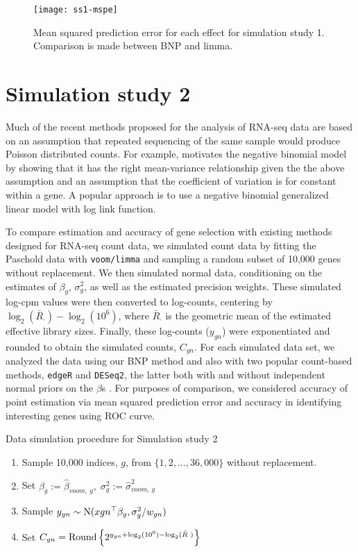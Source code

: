\begin{figure}[ht!]
\centering
\texttt{[image: ss1-mspe]}
\begin{minipage}{.8\textwidth}
\caption{\small Mean squared prediction error for each effect for simulation study 1. Comparison is made between BNP and limma.}
\label{mspe-ss1}
\end{minipage}
\end{figure}

\section{Simulation study 2}
\label{sec:ss2}
Much of the recent methods proposed for the analysis of RNA-seq data are based on an assumption that repeated sequencing of the same sample would produce Poisson distributed counts. For example, \cite{mccarthy} motivates the negative binomial model by showing that it has the right mean-variance relationship given the the above assumption and an assumption that the coefficient of variation is for constant within a gene. A popular approach is to use a negative binomial generalized linear model with log link function.

To compare estimation and accuracy of gene selection with existing methods designed for RNA-seq count data, we simulated count data by fitting the Paschold data with \texttt{voom/limma} and sampling a random subset of 10,000 genes without replacement. We then simulated normal data, conditioning on the estimates of $\beta_g$, $\sigma^2_g$, as well as the estimated precision weights. These simulated log-cpm values were then converted to log-counts, centering by $\log_2(\bar{R}_\cdot)-\log_2(10^6)$, where $\bar{R}_\cdot$ is the geometric mean of the estimated effective library sizes. Finally, these log-counts ($y_{gn}$) were exponentiated and rounded to obtain the simulated counts, $C_{gn}$. For each simulated data set, we analyzed the data using our BNP method and also with two popular count-based methods, \texttt{edgeR} and \texttt{DESeq2}, the latter both with and without independent normal priors on the $\beta$s \citep{edger2010,deseq2014}. For purposes of comparison, we considered accuracy of point estimation via mean squared prediction error and accuracy in identifying interesting genes using ROC curve.
\begin{table}
\caption{Data simulation procedure for Simulation study 2}
\begin{enumerate}
\item Sample 10,000 indices, $g$, from $\{1,2,\ldots,36,000\}$ without replacement.
\item Set $\beta_g:= \hat{\beta}_{voom,~g},\; \sigma^2_g:= \hat{\sigma}^2_{voom,~g}$
\item Sample $y_{gn} \sim \operatorname{N}(x{gn}^\top\beta_g, \sigma^2_g/w_{gn})$
\item Set $C_{gn} = \operatorname{Round} \left\{ 2^{y_{gn} + \log_2(10^6) - \log_2(\bar{R}_{\cdot})} \right\}$
\end{enumerate}
\end{table}


